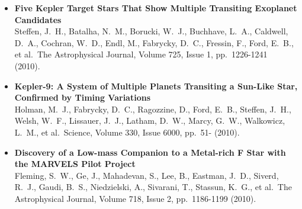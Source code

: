 \documentclass[11pt,letterpaper,sans]{moderncv} %
\begin{document}
\begin{itemize}
 \item \textbf{ Five Kepler Target Stars That Show Multiple Transiting 
Exoplanet Candidates } \\ Steffen, J.~H., Batalha, N.~M., Borucki, W.~J., 
Buchhave, L.~A., Caldwell, D.~A., Cochran, W.~D., Endl, M., Fabrycky, 
D.~C., Fressin, F., Ford, E.~B., et al.\ The Astrophysical Journal, Volume 
725, Issue 1, pp.~1226-1241 (2010).\ \\ 

 \item \textbf{ Kepler-9: A System of Multiple Planets Transiting a 
Sun-Like Star, Confirmed by Timing Variations } \\ Holman, M.~J., Fabrycky, 
D.~C., Ragozzine, D., Ford, E.~B., Steffen, J.~H., Welsh, W.~F., Lissauer, 
J.~J., Latham, D.~W., Marcy, G.~W., Walkowicz, L.~M., et al.\ Science, 
Volume 330, Issue 6000, pp.~51- (2010).\ \\ 

 \item \textbf{ Discovery of a Low-mass Companion to a Metal-rich F Star 
with the MARVELS Pilot Project } \\ Fleming, S.~W., Ge, J., Mahadevan, S., 
Lee, B., Eastman, J.~D., Siverd, R.~J., Gaudi, B.~S., Niedzielski, A., 
Sivarani, T., Stassun, K.~G., et al.\ The Astrophysical Journal, Volume 
718, Issue 2, pp.~1186-1199 (2010).\ \\ 


\end{itemize}

\newpage
\end{document}
